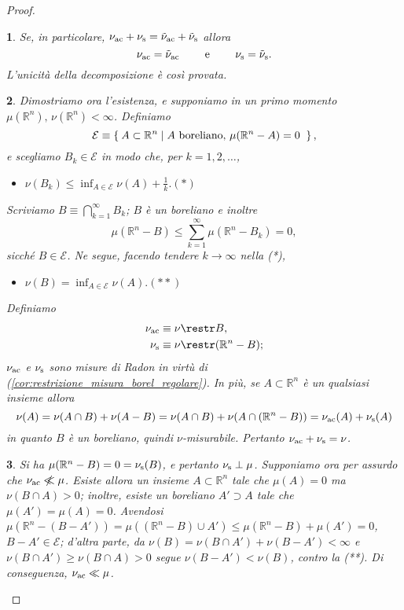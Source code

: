 \documentclass[a4paper,10pt,openright,oneside]{book}
\theoremstyle{theoremstyle}
\theoremstyle{theoremstylewoheader}
\theoremstyle{theoremstyle}
\theoremstyle{proofsecstyle}
\newtheorem{proofsec}{}
\theoremstyle{nonumberplain}
\newtheorem{proof}{Dim.}
\newcommand{\EE}{\ensuremath{\mathcal{E}}}
\newcommand{\RR}{\ensuremath{\mathbb{R}}}
\newcommand{\nll}{\centernot\ll}
\newcommand{\mymath}[2]{\begin{itemize}%
  \item[]\hfill\hbox{}\ensuremath{\displaystyle #1}\hfill\ensuremath{\displaystyle #2}%
  \end{itemize}}
\begin{document}
\begin{proof}
\begin{proofsec}
Se, in particolare, $\nu_\textup{ac} + \nu_\textup{s} = \tilde{\nu}_\textup{ac} + \tilde{\nu}_\textup{s}$ allora
\[
\nu_\textup{ac} = \tilde{\nu}_\textup{ac} \qquad\text{ e }\qquad \nu_\textup{s} = \tilde{\nu}_\textup{s}.
\]
L'unicità della decomposizione è così provata.
\end{proofsec}

\begin{proofsec}
Dimostriamo ora l'esistenza, e supponiamo in un primo momento $\mu(\RR^n),\, \nu(\RR^n) < \infty$. Definiamo
\[
\EE \equiv \Set{ A \subset \RR^n | A \text{ boreliano, $\mu(\RR^n - A) = 0$ } },
\]
e scegliamo $B_k \in \EE$ in modo che, per $k = 1, 2, \ldots$, \mymath{\nu(B_k) \le \inf_{A \in \EE} \nu(A) + \frac{1}{k}.}{(*)} Scriviamo $B \equiv \bigcap_{k=1}^\infty B_k$; $B$ è un boreliano e inoltre
\[
\mu(\RR^n - B) \le \sum_{k=1}^\infty \mu(\RR^n - B_k) = 0,
\]
sicché $B \in \EE$. Ne segue, facendo tendere $k \to \infty$ nella (*), \mymath{\nu(B) = \inf_{A \in \EE} \nu(A).}{(**)} Definiamo
\begin{align*}
\nu_\textup{ac} &\equiv \nu\restr B,\\
\nu_\textup{s} &\equiv \nu\restr(\RR^n - B);
\end{align*}
$\nu_\textup{ac}$ e $\nu_\textup{s}$ sono misure di Radon in virtù di (\ref{cor:restrizione_misura_borel_regolare}). In più, se $A \subset \RR^n$ è un qualsiasi insieme allora
\[
\nu(A) = \nu(A \cap B) + \nu(A - B) = \nu(A \cap B) + \nu(A \cap (\RR^n - B)) = \nu_\textup{ac}(A) + \nu_\textup{s}(A)
\]
in quanto $B$ è un boreliano, quindi $\nu$-misurabile. Pertanto $\nu_\textup{ac} + \nu_\textup{s} = \nu$.
\end{proofsec}

\begin{proofsec}
Si ha $\mu(\RR^n - B) = 0 = \nu_\textup{s}(B)$, e pertanto $\nu_\textup{s} \perp \mu$. Supponiamo ora per assurdo che $\nu_\textup{ac} \nll \mu$. Esiste allora un insieme $A \subset \RR^n$ tale che $\mu(A) = 0$ ma $\nu(B \cap A) > 0$; inoltre, esiste un boreliano $A' \supset A$ tale che $\mu(A') = \mu(A) = 0$. Avendosi $\mu(\RR^n - (B - A')) = \mu((\RR^n - B) \cup A') \le \mu(\RR^n - B) + \mu(A') = 0$, $B - A' \in \EE$; d'altra parte, da $\nu(B) = \nu(B \cap A') + \nu(B - A') < \infty$ e $\nu(B \cap A') \ge \nu(B \cap A) > 0$ segue $\nu(B - A') < \nu(B)$, contro la (**). Di conseguenza, $\nu_\textup{ac} \ll \mu$.
\end{proofsec}


\end{proof}
\end{document}
